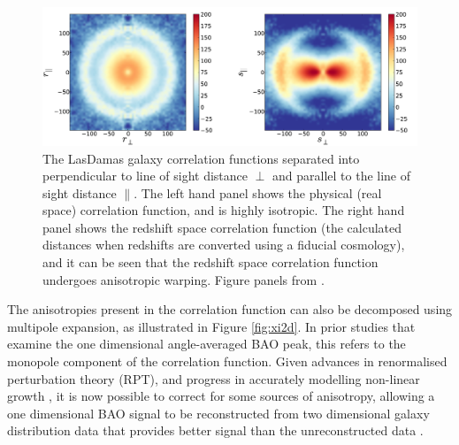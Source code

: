 \documentclass[titlesmallcaps, examinerscopy, copyrightpage]{uqthesis}
\begin{document}
\begin{figure}[h!]
  \begin{center}
    \includegraphics[width=\textwidth]{images/anisotropies.jpg}
  \end{center}
  \caption{The LasDamas galaxy correlation functions separated into perpendicular to line of sight distance $\perp$ and parallel to the line of sight distance $\parallel$. The left hand panel shows the physical (real space) correlation function, and is highly isotropic. The right hand panel shows the redshift space correlation function (the calculated distances when redshifts are converted using a fiducial cosmology), and it can be seen that the redshift space correlation function undergoes anisotropic warping. Figure panels from \citet{PadmanabhanXuEisenstein2012}.}
  \label{fig:ani}
\end{figure}

The anisotropies present in the correlation function can also be decomposed using multipole expansion, as illustrated in Figure \ref{fig:xi2d}. In prior studies that examine the one dimensional angle-averaged BAO peak, this refers to the monopole component of the correlation function. Given advances in renormalised perturbation theory (RPT), and progress in accurately modelling non-linear growth \citep{CrocceScoccimarro2006, Matsubara2008Resumming, Matsubara2008, TaruyaNishimichi2009}, it is now possible to correct for some sources of anisotropy, allowing a one dimensional BAO signal to be reconstructed from two dimensional galaxy distribution data that provides better signal than the unreconstructed data \citep{EisensteinSeoSirko2007, SeoEckelEisenstein2010, PadmanabhanXuEisenstein2012, KazinKoda2014}. \\
\end{document}
